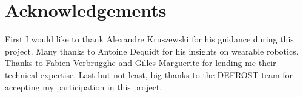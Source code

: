 \chapter{Acknowledgements}
First I would like to thank Alexandre Kruszewski for his guidance during this project.
Many thanks to Antoine Dequidt for his insights on wearable robotics.
Thanks to Fabien Verbrugghe and Gilles Marguerite for lending me their technical expertise.
Last but not least, big thanks to the DEFROST team for accepting my participation 
in this project.
